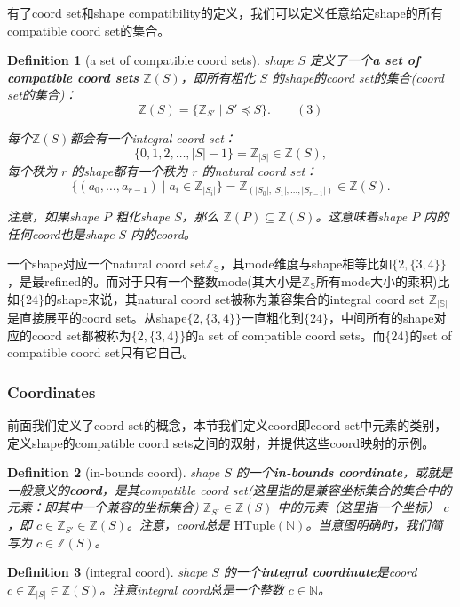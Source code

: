 \documentclass{article}
\newtheorem{definition}{Definition}[section]
\begin{document}
有了coord set和shape compatibility的定义，我们可以定义任意给定shape的所有compatible coord set的集合。
\begin{definition}[a set of compatible coord sets]
shape \(S\) 定义了一个\textbf{a set of compatible coord sets} \(\mathbb{Z}(S)\)，即所有粗化 \(S\) 的shape的coord set的集合(coord set的集合)：
\[
\mathbb{Z}(S) = \{\mathbb{Z}_{S'} \mid S' \preceq S\}.  \qquad (3)
\]

每个$\mathbb{Z}(S)$都会有一个integral coord set：
\[
\{0, 1, 2, \ldots, |S|-1\} = \mathbb{Z}_{|S|} \in \mathbb{Z}(S),
\]
每个秩为 \(r\) 的shape都有一个秩为 \(r\) 的natural coord set：
\[
\{(a_0, \ldots, a_{r-1}) \mid a_i \in \mathbb{Z}_{|S_i|}\} = \mathbb{Z}_{(|S_0|, |S_1|, \ldots, |S_{r-1}|)} \in \mathbb{Z}(S).
\]

注意，如果shape \(P\) 粗化shape \(S\)，那么 \(\mathbb{Z}(P) \subseteq \mathbb{Z}(S)\)。这意味着shape \(P\) 内的任何coord也是shape \(S\) 内的coord。
\end{definition}

\begin{mycomment}
一个shape对应一个natural coord set\(\mathbb{Z_{S}}\)，其mode维度与shape相等比如$\{2, \{3,4\}\}$，是最refined的。而对于只有一个整数mode(其大小是$\mathbb{Z_{S}}$所有mode大小的乘积)比如$\{24\}$的shape来说，其natural coord set被称为兼容集合的integral coord set \(\mathbb{Z_{|S|}}\)是直接展平的coord set。从shape$\{2, \{3,4\}\}$一直粗化到$\{24\}$，中间所有的shape对应的coord set都被称为$\{2, \{3,4\}\}$的a set of compatible coord sets。而$\{24\}$的set of compatible coord set只有它自己。
\end{mycomment}

\subsubsection{Coordinates}
前面我们定义了coord set的概念，本节我们定义coord即coord set中元素的类别，定义shape的compatible coord sets之间的双射，并提供这些coord映射的示例。
\begin{definition}[in-bounds coord]
shape \(S\) 的一个\textbf{in-bounds coordinate}，或就是一般意义的\textbf{coord}，是其compatible coord set(这里指的是兼容坐标集合的集合中的元素：即其中一个兼容的坐标集合) \(\mathbb{Z}_{S'} \in \mathbb{Z}(S)\) 中的元素（这里指一个坐标） \(c\)，即 \(c \in \mathbb{Z}_{S'} \in \mathbb{Z}(S)\)。注意，coord总是 \(\mathrm{HTuple}(\mathbb{N})\)。当意图明确时，我们简写为 \(c \in \mathbb{Z}(S)\)。
\end{definition}

\begin{definition}[integral coord]
shape \(S\) 的一个\textbf{integral coordinate}是coord \(\bar{c} \in \mathbb{Z}_{|S|} \in \mathbb{Z}(S)\)。注意integral coord总是一个整数 \(\bar{c} \in \mathbb{N}\)。
\end{definition}
\end{document}
